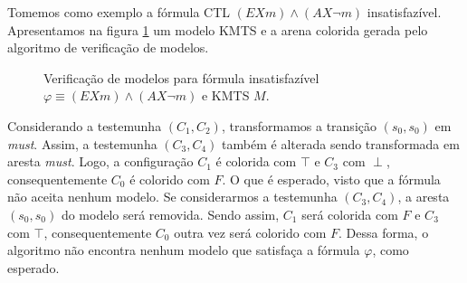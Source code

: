 \documentclass[normaltoc,capchap,capsec,times]{abnt}
\begin{document}
Tomemos como exemplo a fórmula CTL $ (EX m) \wedge (AX \neg m)$ insatisfazível. Apresentamos na figura \ref{fig:exinsat} um modelo KMTS e a arena colorida gerada pelo algoritmo de verificação de modelos.

\begin{figure}[htb]
\begin{center}
\end{center}
\caption[Verificação de modelos para fórmula insatisfazível]{Verificação de modelos para fórmula insatisfazível $ \varphi \equiv (EX m) \wedge (AX \neg m) $ e KMTS $M$.}
\label{fig:exinsat}
\end{figure}

Considerando a testemunha $(C_1,C_2)$, transformamos a transição $(s_0,s_0)$ em \textit{must}. Assim, a testemunha $(C_3,C_4)$ também é alterada sendo transformada em aresta \textit{must}. Logo, a configuração $C_1$ é colorida com $\top$ e $C_3$ com $\perp$, consequentemente $C_0$ é colorido com $F$. O que é esperado, visto que a fórmula não aceita nenhum modelo. Se considerarmos a testemunha $(C_3, C_4)$, a aresta $(s_0,s_0)$ do modelo será removida. Sendo assim, $C_1$ será colorida com $F$ e $C_3$ com $\top$, consequentemente $C_0$ outra vez será colorido com $F$. Dessa forma, o algoritmo não encontra nenhum modelo que satisfaça a fórmula $\varphi$, como esperado.
\end{document}
